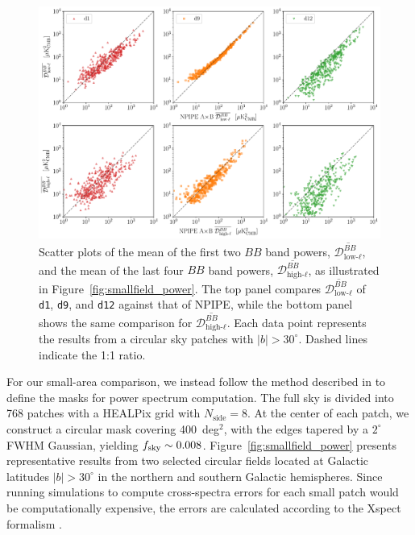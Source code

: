 \documentclass[twocolumn]{aastex631}
\begin{document}
\begin{figure}
    \centering
    \includegraphics[width=2.1\columnwidth]{figures/llmean_hlmean_comparison.pdf}
    \caption{Scatter plots of the mean of the first two $BB$ band powers, $\overline{\mathcal{D}_{\text{low-}\ell}^{BB}}$, and the mean of the last four $BB$ band powers, $\overline{\mathcal{D}_{\text{high-}\ell}^{BB}}$, as illustrated in Figure~\ref{fig:smallfield_power}. The top panel compares $\overline{\mathcal{D}_{\text{low-}\ell}^{BB}}$ of \texttt{d1}, \texttt{d9}, and \texttt{d12} against that of NPIPE, while the bottom panel shows the same comparison for $\overline{\mathcal{D}_{\text{high-}\ell}^{BB}}$. Each data point represents the results from a circular sky patches with $|b| > 30^\circ$. Dashed lines indicate the 1:1 ratio.}
    \label{fig:smallfield_power_all}
\end{figure}

For our small-area comparison, we instead follow the method described in \cite{planck2014-XXX} to define the masks for power spectrum computation. The full sky is divided into 768 patches with a HEALPix grid with $N_\text{side} = 8$. At the center of each patch, we construct a circular mask covering 400~deg$^2$, with the edges tapered by a $2^\circ$ FWHM Gaussian, yielding $f_{\rm sky} \sim 0.008$. Figure~\ref{fig:smallfield_power} presents representative results from two selected circular fields located at Galactic latitudes $|b| > 30^\circ$ in the northern and southern Galactic hemispheres. Since running simulations to compute cross-spectra errors for each small patch would be computationally expensive, the errors are calculated according to the Xspect formalism \citep{Tristram:2005}. 
\end{document}
